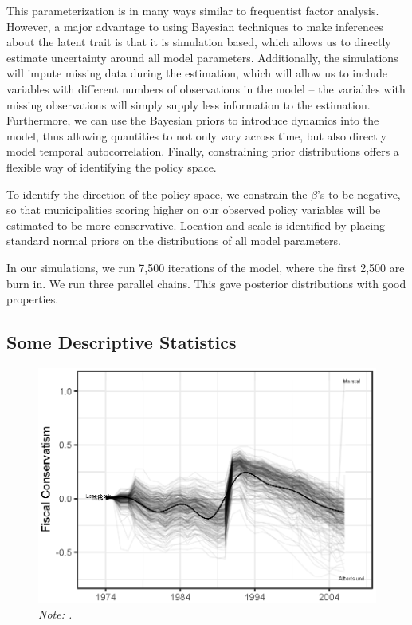 \documentclass[a4paper,11pt]{article}
\newcommand\fnote[1]{\captionsetup{font=small}\caption*{#1}}
\begin{document}
This parameterization is in many ways similar to frequentist factor analysis. However, a major advantage to using Bayesian techniques to make inferences about the latent trait is that it is simulation based, which allows us to directly estimate uncertainty around all model parameters. Additionally, the simulations will impute missing data during the estimation, which will allow us to include variables with different numbers of observations in the model -- the variables with missing observations will simply supply less information to the estimation. Furthermore, we can use the Bayesian priors to introduce dynamics into the model, thus allowing quantities to not only vary across time, but also directly model temporal autocorrelation. Finally, constraining prior distributions offers a flexible way of identifying the policy space.

To identify the direction of the policy space, we constrain the $\beta$'s to be negative, so that municipalities scoring higher on our observed policy variables will be estimated to be more conservative. Location and scale is identified by placing standard normal priors on the distributions of all model parameters.

In our simulations, we run 7,500 iterations of the model, where the first 2,500 are burn in. We run three parallel chains. This gave posterior distributions with good properties.



\subsection{Some Descriptive Statistics}

\begin{figure}[!htb]
	\centering
	\includegraphics[scale = .85]{times_lines_inflation_adjusted.eps}
	\caption{\textbf{.}} \fnote{\emph{Note: .}}
	\label{fig:PermTest}
\end{figure}
\end{document}
